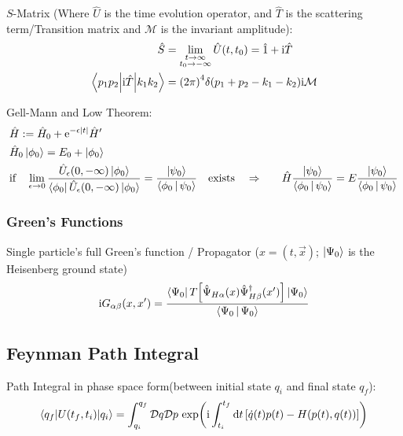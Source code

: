 		\noindent
		$S$-Matrix (Where $\hat{U}$ is the time evolution operator, and $\hat{T}$ is the scattering term/Transition matrix and $\mathcal{M}$ is the invariant amplitude):
		\begin{equation}
			\begin{aligned}
				\hat{S} &= \lim_{\substack{t\rightarrow\infty\\t_0\rightarrow-\infty}} \hat{U}(t,t_0) = \hat{1} + \mathrm{i} \hat{T} \\
				\mel**{p_{1}p_{2}}{\mathrm{i} \hat{T}}{k_{1}k_{2}} &= \qty(2\pi)^4\delta(p_1 + p_2 - k_1 - k_2) \mathrm{i} \mathcal{M} \\
			\end{aligned}
		\end{equation}

		\noindent
		Gell-Mann and Low Theorem:
		\begin{equation}
			\begin{aligned}
				&\hat{H} := \hat{H}_0 + \mathrm{e}^{-\epsilon \abs{t}} \hat{H}' \\
				&\hat{H}_0 \Ket{\phi_0} = E_0 + \Ket{\phi_0} \\
				&\text{if}\quad \lim_{\epsilon\rightarrow 0} \frac{\hat{U}_\epsilon(0,-\infty)\Ket{\phi_0}}{\Bra{\phi_0} \hat{U}_\epsilon(0,-\infty)\Ket{\phi_0}}
				= \frac{\Ket{\psi_0}}{\Braket{\phi_0|\psi_0}} \quad\text{exists}\quad
				\Rightarrow&\quad \hat{H} \frac{\Ket{\psi_0}}{\Braket{\phi_0|\psi_0}} = E \frac{\Ket{\psi_0}}{\Braket{\phi_0|\psi_0}} \\
			\end{aligned}
		\end{equation}

		\subsubsection{Green's Functions}
			Single particle's full Green's function / Propagator  ($x=(t,\vec{x})$; $\Ket{\Psi_0}$ is the Heisenberg ground state)
			\begin{equation}
				\begin{aligned}
					\mathrm{i} G_{\alpha\beta}(x, x') &= \frac{\Bra{\Psi_0} T\qty[\hat{\Psi}_{H\alpha}(x)\hat{\Psi}^\dagger_{H\beta}(x')] \Ket{\Psi_0}}{\Braket{\Psi_0|\Psi_0}} \\					
				\end{aligned}
			\end{equation}


	\subsection{Feynman Path Integral}
		Path Integral in phase space form(between initial state $q_i$ and final state $q_f$):
		\begin{equation}
			\mel**{q_f}{U(t_f, t_i)}{q_i} = \int_{q_i}^{q_f} \mathcal{D}q \mathcal{D}p \, \exp(\mathrm{i} \int_{t_i}^{t_f} \dd t \, \qty[ \dot{q}(t)p(t) - H\qty(p(t),q(t))])
		\end{equation}
		
